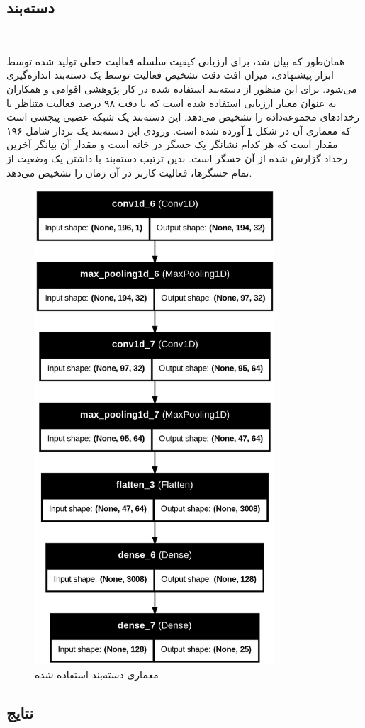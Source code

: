 \subsection{دسته‌بند}‌

همان‌طور که بیان شد، برای ارزیابی کیفیت سلسله فعالیت‌ جعلی تولید شده توسط ابزار پیشنهادی، میزان افت دقت تشخیص فعالیت توسط یک دسته‌بند اندازه‌گیری می‌شود. برای این منظور از دسته‌بند استفاده شده در کار پژوهشی اقوامی و همکاران \cite{x3341} به عنوان معیار ارزیابی استفاده شده است که با دقت ۹۸ درصد فعالیت متناظر با رخدادهای مجموعه‌داده  را تشخیص می‌دهد. این دسته‌بند یک شبکه عصبی پیچشی است که معماری آن در شکل \ref{fig:fO4H5} آورده شده است. ورودی این دسته‌بند یک بردار شامل ۱۹۶ مقدار است که هر کدام نشانگر یک حسگر در خانه است و مقدار آن بیانگر آخرین رخداد گزارش شده از آن حسگر است. بدین ترتیب دسته‌بند با داشتن یک وضعیت از تمام حسگرها، فعالیت کاربر در آن زمان را تشخیص می‌دهد.


\begin{figure}[H]
\centerline{\includegraphics[width=0.8\textwidth]{figs/fO4H5.png}}
\caption{معماری دسته‌بند استفاده شده}
\label{fig:fO4H5}
\end{figure}

\subsection{نتایج}‌

